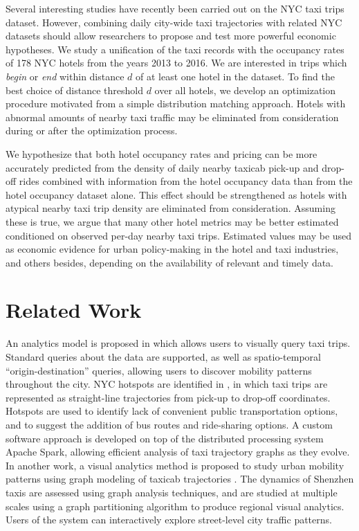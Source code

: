 \documentclass[useAMS, usenatbib]{biom}
\begin{document}
Several interesting studies have recently been carried out on the NYC taxi trips dataset. However, combining daily city-wide taxi trajectories with related NYC datasets should allow researchers to propose and test more powerful economic hypotheses. We study a unification of the taxi records with the occupancy rates of 178 NYC hotels from the years 2013 to 2016. We are interested in trips which \textit{begin} or \textit{end} within distance $d$ of at least one hotel in the dataset. To find the best choice of distance threshold $d$ over all hotels, we develop an optimization procedure motivated from a simple distribution matching approach. Hotels with abnormal amounts of nearby taxi traffic may be eliminated from consideration during or after the optimization process.

We hypothesize that both hotel occupancy rates and pricing can be more accurately predicted from the density of daily nearby taxicab pick-up and drop-off rides combined with information from the hotel occupancy data than from the hotel occupancy dataset alone. This effect should be strengthened as hotels with atypical nearby taxi trip density are eliminated from consideration. Assuming these is true, we argue that many other hotel metrics may be better estimated conditioned on observed per-day nearby taxi trips. Estimated values may be used as economic evidence for urban policy-making in the hotel and taxi industries, and others besides, depending on the availability of relevant and timely data.

\section{Related Work}
\label{s:related}

An analytics model is proposed in \citet{Ferreira2013VisualEO} which allows users to visually query taxi trips. Standard queries about the data are supported, as well as spatio-temporal ``origin-destination'' queries, allowing users to discover mobility patterns throughout the city. NYC hotspots are identified in \citet{Stoyanovich2017ZoomingIO}, in which taxi trips are represented as straight-line trajectories from pick-up to drop-off coordinates. Hotspots are used to identify lack of convenient public transportation options, and to suggest the addition of bus routes and ride-sharing options. A custom software approach is developed on top of the distributed processing system Apache Spark, allowing efficient analysis of taxi trajectory graphs as they evolve. In another work, a visual analytics method is proposed to study urban mobility patterns using graph modeling of taxicab trajectories \citep{Huang2016TrajGraphAG}. The dynamics of Shenzhen taxis are assessed using graph analysis techniques, and are studied at multiple scales using a graph partitioning algorithm to produce regional visual analytics. Users of the system can interactively explore street-level city traffic patterns. 
\end{document}
